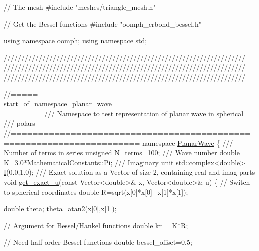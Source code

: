 \begin{DoxyCodeInclude}
\textcolor{comment}{// The mesh}
\textcolor{preprocessor}{#include "meshes/triangle\_mesh.h"}

\textcolor{comment}{// Get the Bessel functions}
\textcolor{preprocessor}{#include "oomph\_crbond\_bessel.h"}

\textcolor{keyword}{using namespace }\hyperlink{namespaceoomph}{oomph};
\textcolor{keyword}{using namespace }\hyperlink{namespacestd}{std};

\textcolor{comment}{}
\textcolor{comment}{/////////////////////////////////////////////////////////////////////}
\textcolor{comment}{/////////////////////////////////////////////////////////////////////}
\textcolor{comment}{/////////////////////////////////////////////////////////////////////}
\textcolor{comment}{}

\textcolor{comment}{//===== start\_of\_namespace\_planar\_wave=================================}\textcolor{comment}{}
\textcolor{comment}{/// Namespace to test representation of planar wave in spherical}
\textcolor{comment}{/// polars}
\textcolor{comment}{}\textcolor{comment}{//=====================================================================}
\textcolor{keyword}{namespace }\hyperlink{namespacePlanarWave}{PlanarWave}
\{
\textcolor{comment}{}
\textcolor{comment}{ /// Number of terms in series}
\textcolor{comment}{} \textcolor{keywordtype}{unsigned} N\_terms=100;
\textcolor{comment}{}
\textcolor{comment}{ /// Wave number}
\textcolor{comment}{} \textcolor{keywordtype}{double} K=3.0*MathematicalConstants::Pi;
\textcolor{comment}{}
\textcolor{comment}{ /// Imaginary unit }
\textcolor{comment}{} std::complex<double> \hyperlink{namespacePlanarWave_a541691caf71477c8c389062797c0fdab}{I}(0.0,1.0); 
\textcolor{comment}{}
\textcolor{comment}{ /// Exact solution as a Vector of size 2, containing real and imag parts}
\textcolor{comment}{} \textcolor{keywordtype}{void} \hyperlink{namespacePlanarWave_a00f252bcf0181187c656a58ce36b07b5}{get\_exact\_u}(\textcolor{keyword}{const} Vector<double>& x, Vector<double>& u)
 \{
  \textcolor{comment}{// Switch to spherical coordinates}
  \textcolor{keywordtype}{double} R=sqrt(x[0]*x[0]+x[1]*x[1]);
  
  \textcolor{keywordtype}{double} theta;
  theta=atan2(x[0],x[1]);
  
  \textcolor{comment}{// Argument for Bessel/Hankel functions}
  \textcolor{keywordtype}{double} kr = K*R;  
  
  \textcolor{comment}{// Need half-order Bessel functions}
  \textcolor{keywordtype}{double} bessel\_offset=0.5;


\end{DoxyCodeInclude}
